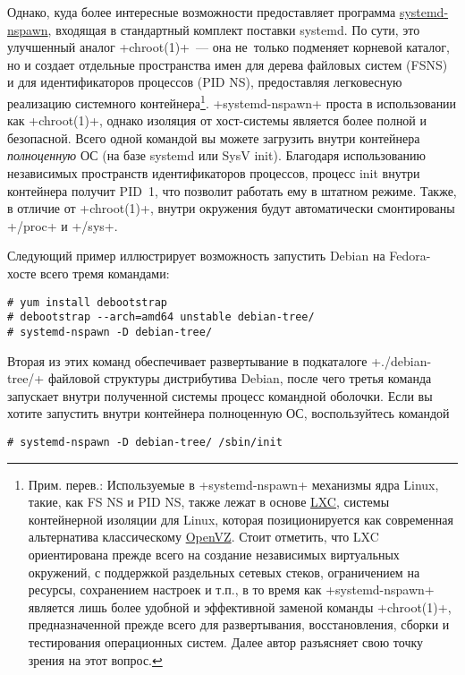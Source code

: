 \documentclass[10pt,oneside,a4paper]{article}
\begin{document}
Однако, куда более интересные возможности предоставляет программа
\href{http://www.freedesktop.org/software/systemd/man/systemd-nspawn.html}{systemd-nspawn},
входящая в стандартный комплект поставки systemd. По сути, это улучшенный аналог
+chroot(1)+~--- она не~только подменяет корневой каталог, но и создает отдельные
пространства имен для дерева файловых систем (FSNS) и для идентификаторов
процессов (PID NS), предоставляя легковесную реализацию системного
контейнера\footnote{Прим. перев.: Используемые в +systemd-nspawn+ механизмы 
ядра Linux, такие, как FS NS и PID NS, также лежат в основе
\href{http://lxc.sourceforge.net/}{LXC}, системы контейнерной изоляции для
Linux, которая позиционируется как современная альтернатива классическому
\href{http://wiki.openvz.org/Main_Page}{OpenVZ}. Стоит отметить, что LXC 
ориентирована прежде всего на создание независимых виртуальных окружений,
с поддержкой раздельных сетевых стеков, ограничением на ресурсы, сохранением
настроек и т.п., в то время как +systemd-nspawn+ является лишь более удобной и
эффективной заменой команды +chroot(1)+, предназначенной прежде всего для
развертывания, восстановления, сборки и тестирования операционных систем. Далее
автор разъясняет свою точку зрения на этот вопрос.}.
+systemd-nspawn+ проста в использовании как +chroot(1)+, однако изоляция
от хост-системы является более полной и безопасной. Всего одной командой
вы можете загрузить внутри контейнера \emph{полноценную} ОС (на базе systemd
или SysV init). Благодаря использованию независимых пространств идентификаторов
процессов, процесс init внутри контейнера получит PID~1, что позволит работать
ему в штатном режиме. Также, в отличие от +chroot(1)+, внутри окружения 
будут автоматически смонтированы +/proc+ и +/sys+.

Следующий пример иллюстрирует возможность запустить Debian на Fedora-хосте
всего тремя командами:
\begin{Verbatim}
# yum install debootstrap
# debootstrap --arch=amd64 unstable debian-tree/
# systemd-nspawn -D debian-tree/
\end{Verbatim}

Вторая из этих команд обеспечивает развертывание в подкаталоге +./debian-tree/+
файловой структуры дистрибутива Debian, после чего третья команда запускает
внутри полученной системы процесс командной оболочки. Если вы хотите запустить
внутри контейнера полноценную ОС, воспользуйтесь командой
\begin{Verbatim}
# systemd-nspawn -D debian-tree/ /sbin/init
\end{Verbatim}
\end{document}

